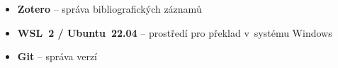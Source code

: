 \begin{itemize}[%
  label={},%
  leftmargin=0pt,%
  labelsep=0pt,%
  itemsep=0.5\baselineskip,%
  parsep=0pt,%
  topsep=0pt,%
  partopsep=0pt]
  \item \textbf{Zotero} -- správa bibliografických záznamů

  \item \textbf{WSL~2 / Ubuntu~22.04} -- prostředí pro překlad v~systému Windows

  \item \textbf{Git} -- správa verzí


\end{itemize}
